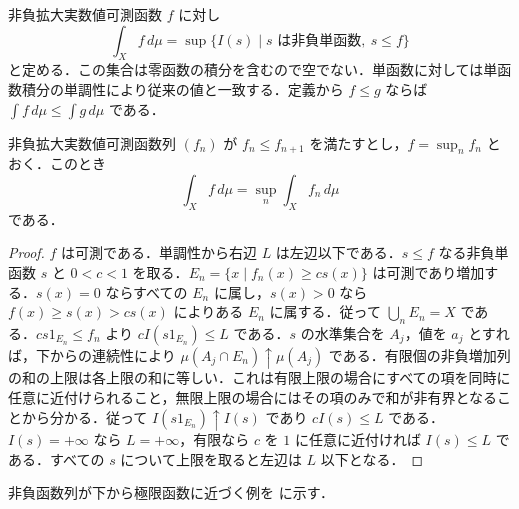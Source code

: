 \begin{defn}[非負可測函数の積分]
非負拡大実数値可測函数 $f$ に対し
\[
 \int_X f\,d\mu=\sup\{I(s)\mid s\text{ は非負単函数},\ s\leq f\}
\]
と定める．この集合は零函数の積分を含むので空でない．単函数に対しては単函数積分の単調性により従来の値と一致する．定義から $f\leq g$ ならば $\int f\,d\mu\leq\int g\,d\mu$ である．
\end{defn}
\begin{prop}[単調収束定理]
非負拡大実数値可測函数列 $(f_n)$ が $f_n\leq f_{n+1}$ を満たすとし，$f=\sup_n f_n$ とおく．このとき
\[
 \int_X f\,d\mu=\sup_n\int_X f_n\,d\mu
\]
である．
\end{prop}
\begin{proof}
$f$ は可測である．単調性から右辺 $L$ は左辺以下である．$s\leq f$ なる非負単函数 $s$ と $0<c<1$ を取る．$E_n=\{x\mid f_n(x)\geq c s(x)\}$ は可測であり増加する．$s(x)=0$ ならすべての $E_n$ に属し，$s(x)>0$ なら $f(x)\geq s(x)>cs(x)$ によりある $E_n$ に属する．従って $\bigcup_n E_n=X$ である．$cs1_{E_n}\leq f_n$ より $cI(s1_{E_n})\leq L$ である．$s$ の水準集合を $A_j$，値を $a_j$ とすれば，下からの連続性により $\mu(A_j\cap E_n)\uparrow\mu(A_j)$ である．有限個の非負増加列の和の上限は各上限の和に等しい．これは有限上限の場合にすべての項を同時に任意に近付けられること，無限上限の場合にはその項のみで和が非有界となることから分かる．従って $I(s1_{E_n})\uparrow I(s)$ であり $cI(s)\leq L$ である．$I(s)=+\infty$ なら $L=+\infty$，有限なら $c$ を $1$ に任意に近付ければ $I(s)\leq L$ である．すべての $s$ について上限を取ると左辺は $L$ 以下となる．
\end{proof}
非負函数列が下から極限函数に近づく例を  に示す．
